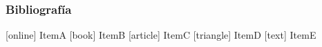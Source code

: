 \documentclass[11pt,a4paper]{beamer}
\begin{document}
%  
%   

\begin{frame}
\frametitle{Bibliografía}
\begin{thebibliography}{9}
[online]
 ItemA
[book]
 ItemB
[article]
 ItemC
[triangle]
 ItemD
[text]
 ItemE
\end{thebibliography}
\end{frame}
\end{document}

